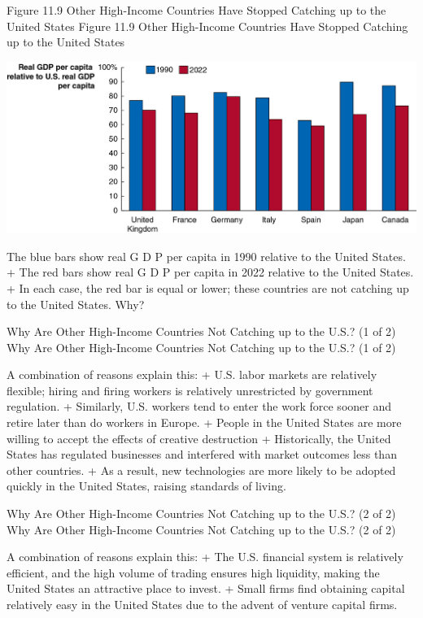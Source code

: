\documentclass[
  12pt,
  ignorenonframetext,
]{beamer}
\begin{document}
\begin{frame}{Figure 11.9 Other High-Income Countries Have Stopped
Catching up to the United States}
\protect\hypertarget{figure-11.9-other-high-income-countries-have-stopped-catching-up-to-the-united-states}{}
Figure 11.9 Other High-Income Countries Have Stopped Catching up to the
United States

\includegraphics[width=\textwidth,height=0.99\textheight]{imgs3/img_slide40a.png}

The blue bars show real G D P per capita in 1990 relative to the United
States. + The red bars show real G D P per capita in 2022 relative to
the United States. + In each case, the red bar is equal or lower; these
countries are not catching up to the United States. Why?
\end{frame}

\begin{frame}{Why Are Other High-Income Countries Not Catching up to the
U.S.? (1 of 2)}
\protect\hypertarget{why-are-other-high-income-countries-not-catching-up-to-the-u.s.-1-of-2}{}
Why Are Other High-Income Countries Not Catching up to the U.S.? (1 of
2)

A combination of reasons explain this: + U.S. labor markets are
relatively flexible; hiring and firing workers is relatively
unrestricted by government regulation. + Similarly, U.S. workers tend to
enter the work force sooner and retire later than do workers in Europe.
+ People in the United States are more willing to accept the effects of
creative destruction + Historically, the United States has regulated
businesses and interfered with market outcomes less than other
countries. + As a result, new technologies are more likely to be adopted
quickly in the United States, raising standards of living.
\end{frame}

\begin{frame}{Why Are Other High-Income Countries Not Catching up to the
U.S.? (2 of 2)}
\protect\hypertarget{why-are-other-high-income-countries-not-catching-up-to-the-u.s.-2-of-2}{}
Why Are Other High-Income Countries Not Catching up to the U.S.? (2 of
2)

A combination of reasons explain this: + The U.S. financial system is
relatively efficient, and the high volume of trading ensures high
liquidity, making the United States an attractive place to invest. +
Small firms find obtaining capital relatively easy in the United States
due to the advent of venture capital firms.
\end{frame}
\end{document}
